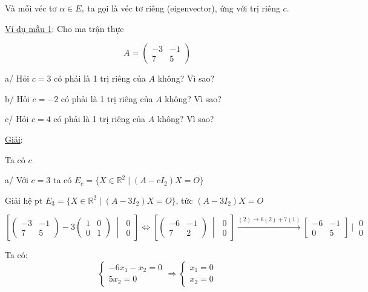 \documentclass[12pt,a4paper]{article}
\newcommand{\R}{\mathbb{R}}
\begin{document}
Và mỗi véc tơ $\alpha\in E_c$ ta gọi là véc tơ riêng (eigenvector), ứng với trị riêng $c$.

\medskip
\noindent\underline{Ví dụ mẫu 1}: Cho ma trận thực

\[
A=\begin{pmatrix}-3 & -1\\ 7 & 5\end{pmatrix}
\]

a/ Hỏi $c=3$ có phải là 1 trị riêng của $A$ không? Vì sao?

b/ Hỏi $c=-2$ có phải là 1 trị riêng của $A$ không? Vì sao?

c/ Hỏi $c=4$ có phải là 1 trị riêng của $A$ không? Vì sao?

\medskip
\noindent\underline{Giải}:

Ta có $c$

a/ Với $c=3$ ta có $E_c=\{X\in\R^2 \mid (A-cI_2)X=O\}$

Giải hệ pt $E_3=\{X\in\R^2 \mid (A-3I_2)X=O\}$, tức $(A-3I_2)X=O$

\[
\left[\begin{pmatrix}-3 & -1\\ 7 & 5\end{pmatrix}-3\begin{pmatrix}1 & 0\\ 0 & 1\end{pmatrix}\ \middle|\ \begin{matrix}0\\0\end{matrix}\right]
\Leftrightarrow
\left[\begin{pmatrix}-6 & -1\\ 7 & 2\end{pmatrix}\ \middle|\ \begin{matrix}0\\0\end{matrix}\right]
\xrightarrow{(2)\to 6(2)+7(1)}
\begin{bmatrix}-6 & -1\\ 0 & 5\end{bmatrix}\ \big|\ \begin{matrix}0\\0\end{matrix}
\]

Ta có:
\[
\begin{cases}-6x_1-x_2=0\\ 5x_2=0\end{cases}
\Rightarrow
\begin{cases}x_1=0\\ x_2=0\end{cases}
\]
\end{document}

